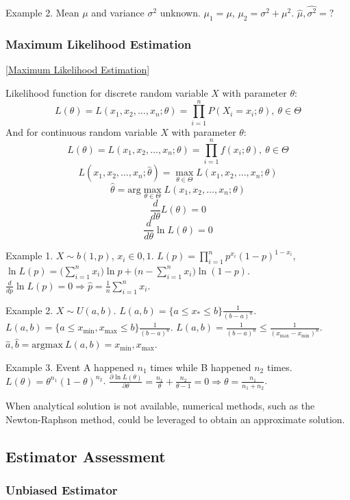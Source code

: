 Example 2. Mean $\mu$ and variance $\sigma^2$ unknown.
$\mu_1 = \mu$, $\mu_2 = \sigma^2 + \mu^2$.
$\hat{\mu}, \hat{\sigma^2} = ?$

\subsubsection{Maximum Likelihood Estimation}

[\href{https://en.wikipedia.org/wiki/Maximum_likelihood_estimation}{Maximum Likelihood Estimation}]

Likelihood function for discrete random variable $X$ with parameter $\theta$:
$$ L(\theta) = L(x_1,x_2,\ldots,x_n;\theta) = \prod_{i=1}^n P(X_i=x_i;\theta), ~\theta\in\Theta$$
And for continuous random variable $X$ with parameter $\theta$:
$$ L(\theta) = L(x_1,x_2,\ldots,x_n;\theta) = \prod_{i=1}^n f(x_i;\theta), ~\theta\in\Theta$$
$$ L(x_1,x_2,\ldots,x_n;\hat{\theta}) = \max_{\theta\in\Theta} L(x_1,x_2,\ldots,x_n;\theta) $$
$$ \hat{\theta} = \text{arg}\max_{\theta\in\Theta} L(x_1,x_2,\ldots,x_n;\theta) $$
$$ \frac{d}{d\theta} L(\theta) = 0 $$
$$ \frac{d}{d\theta} \ln L(\theta) = 0 $$

Example 1. $X\sim b(1,p)$, $x_i\in {0,1}$. $L(p) = \prod_{i=1}^n p^{x_i} (1-p)^{1-x_i}$,
$\ln L(p) = \big(\sum_{i=1}^n x_i\big) \ln p + \big(n-\sum_{i=1}^n x_i\big) \ln (1-p)$.
$\frac{d}{dp} \ln L(p) = 0 \Rightarrow \hat{p} = \frac{1}{n} \sum_{i=1}^n x_i$.

Example 2. $X\sim U(a,b)$. $L(a,b) = \{a\leq x_*\leq b\}\frac{1}{(b-a)^n}$.
$L(a,b) = \{a\leq x_{\min}, x_{\max} \leq b\}\frac{1}{(b-a)^n}$.
$L(a,b) = \frac{1}{(b-a)^n} \leqslant \frac{1}{(x_{\max} - x_{\min})^n}$.
$\hat{a},\hat{b} = \text{argmax}~L(a,b) = x_{\min}, x_{\max}$.

Example 3. Event A happened $n_1$ times while B happened $n_2$ times.
$L(\theta)=\theta^{n_1} (1-\theta)^{n_2}$. $\frac{\partial \ln L(\theta)}{\partial \theta}
= \frac{n_1}{\theta} + \frac{n_2}{\theta-1}=0 \Rightarrow \theta = \frac{n_1}{n_1+n_2}$.

When analytical solution is not available, numerical methods, such as the
Newton-Raphson method, could be leveraged to obtain an approximate solution. 

\subsection{Estimator Assessment}

\subsubsection{Unbiased Estimator}

